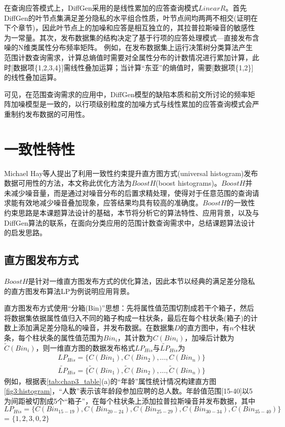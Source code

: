 在查询应答模式上，DiffGen采用的是线性累加的应答查询模式$LinearR$。首先DiffGen的叶节点集满足差分隐私的水平组合性质，叶节点间均两两不相交(证明在下个章节)，因此叶节点上的加噪和应答是相互独立的，其拉普拉斯噪音的敏感性为一常量。其次，发布数据集的结构决定了基于行项的应答处理模式---直接发布含噪的N维类属性分布频率矩阵。
例如，在发布数据集上运行决策树分类算法产生范围计数查询需求，计算总熵值时需要对全属性分布的计数情况进行累加计算，此时[数据项\{1,2,3,4\}]需线性叠加运算；当计算“东亚”的熵值时，需要[数据项\{1,2\}]的线性叠加运算。

可见，在范围查询需求的应用中，DiffGen模型的缺陷本质和前文所讨论的频率矩阵加噪模型是一致的，以行项级别粒度的加噪方式与线性累加的应答查询模式会严重制约发布数据的可用性。


\section{一致性特性}

Michael Hay等人提出了利用一致性约束提升直方图方式(universal histogram)发布数据可用性的方法\supercite{boosting}，本文称此优化方法为$BoostH$(boost histograms)。$BoostH$并未减少噪音量，而是通过对噪音分布的后置求精处理，使得对于任意范围的查询请求能有效地减少噪音叠加现象，应答结果均具有较高的准确度。$BoostH$的一致性约束思路是本课题算法设计的基础，本节将分析它的算法特性、应用背景，以及与DiffGen算法的联系，在面向分类应用的范围计数查询需求中，总结课题算法设计的启发思路。

\subsection{直方图发布方式}  %

$BoostH$是针对一维直方图发布方式的优化算法，因此本节以经典的满足差分隐私的直方图发布算法LP\supercite{Dwork-Calibrating}为例说明应用背景。

直方图发布方式使用“分箱(Bin)”思想\supercite{dp-histogram}：先将属性值范围切割成若干个箱子，然后将数据集依据属性值归入不同的箱子构成一柱状条，最后在每个柱状条(箱子)的计数上添加满足差分隐私的噪音，并发布数据。在数据集$D$的直方图中，有$n$个柱状条，每个柱状条的属性值范围为$Bin_{i}$，其计数为$C(Bin_{i})$，加噪后计数为$\tilde{C}(Bin_{i})$，则一维直方图的数据发布格式$LP_{His}$与$\widetilde{LP}_{His}$为
\[
\begin{split}
	LP_{His} = \{C(Bin_{1}),C(Bin_{2}),...,C(Bin_{n})\}\\
	\widetilde{LP}_{His} = \{\tilde{C}(Bin_{1}),\tilde{C}(Bin_{2}),...,\tilde{C}(Bin_{n})\}	
\end{split}
\]
例如，根据表\ref{tab:chap3_table}(a)的“年龄”属性统计情况构建直方图\ref{fig3:histogram}，“人数”表示该年龄段参加应聘的总人数。年龄值范围[15-40]以5为间距被切割成5个“箱子”，在每个柱状条上添加拉普拉斯噪音并发布数据，其中$LP_{His} = \{C(Bin_{15-19}),C(Bin_{20-24}),C(Bin_{25-29}),C(Bin_{30-34}),C(Bin_{35-40})\}$ = $\{1,2,3,0,2\}$%

